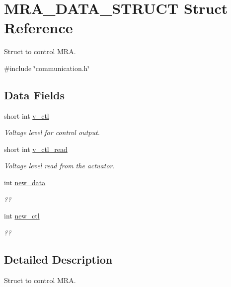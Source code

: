 \hypertarget{structMRA__DATA__STRUCT}{\section{M\-R\-A\-\_\-\-D\-A\-T\-A\-\_\-\-S\-T\-R\-U\-C\-T Struct Reference}
\label{structMRA__DATA__STRUCT}
}


Struct to control M\-R\-A.  




{\ttfamily \#include \char`\"{}communication.\-h\char`\"{}}

\subsection*{Data Fields}
\begin{DoxyCompactItemize}
\item 
short int \hyperlink{structMRA__DATA__STRUCT_a64b4e6bb604e58de593a60c87942b966}{v\-\_\-ctl}
\begin{DoxyCompactList}\small\item\em Voltage level for control output. \end{DoxyCompactList}\item 
short int \hyperlink{structMRA__DATA__STRUCT_a3a31d57268c33b21ac915fdc27dfe474}{v\-\_\-ctl\-\_\-read}
\begin{DoxyCompactList}\small\item\em Voltage level read from the actuator. \end{DoxyCompactList}\item 
int \hyperlink{structMRA__DATA__STRUCT_afca6e851d302f3a786885a4e1eec79d7}{new\-\_\-data}
\begin{DoxyCompactList}\small\item\em ?? \end{DoxyCompactList}\item 
int \hyperlink{structMRA__DATA__STRUCT_a5b1af89ee717f5b14c18e8ac12e93e75}{new\-\_\-ctl}
\begin{DoxyCompactList}\small\item\em ?? \end{DoxyCompactList}\end{DoxyCompactItemize}


\subsection{Detailed Description}
Struct to control M\-R\-A. 

